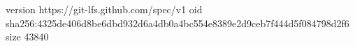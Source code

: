 version https://git-lfs.github.com/spec/v1
oid sha256:4325de406d8be6dbd932d6a4db0a4bc554e8389e2d9ceb7f444d5f084798d2f6
size 43840
